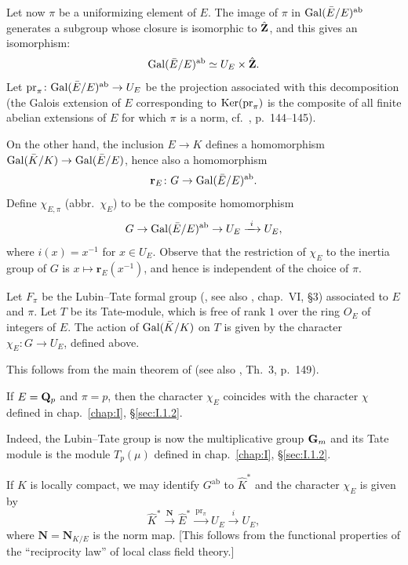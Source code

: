 Let now $\pi$ be a uniformizing element of $E$.  The image of $\pi$ in
$\mathrm{Gal}(\bar E/E)^{\mathrm{ab}}$ generates a subgroup whose closure is
isomorphic to $\hat{\mathbf{Z}}$, and this gives an isomorphism:
\[
\mathrm{Gal}(\bar E/E)^{\mathrm{ab}} \simeq U_E\times\hat{\mathbf{Z}}.
\]
Let $\mathrm{pr}_\pi\colon \mathrm{Gal}(\bar E/E)^{\mathrm{ab}}\to U_E$ be the
projection associated with this decomposition (the Galois extension of
$E$ corresponding to $\mathrm{Ker}(\mathrm{pr}_\pi)$ is the composite of all
finite abelian extensions of $E$ for which $\pi$ is a norm,
cf.~\cite{cassels-frohlich}, p.~144--145).

On the other hand, the inclusion $E\to K$ defines a homomorphism
$\mathrm{Gal}(\bar K/K)\to\mathrm{Gal}(\bar E/E)$, hence also a homomorphism
\[
\mathbf{r}_E\colon G\to\mathrm{Gal}(\bar E/E)^{\mathrm{ab}}.
\]
Define $\chi_{E,\pi}$ (abbr.\ $\chi_E$) to be the composite
homomorphism
\[
G \to \mathrm{Gal}(\bar E/E)^{\mathrm{ab}} \to U_E
\xrightarrow{\ i\ } U_E,
\]
where $i(x)=x^{-1}$ for $x\in U_E$.  Observe that the restriction of
$\chi_E$ to the inertia group of $G$ is $x\mapsto \mathbf{r}_E(x^{-1})$,
and hence is independent of the choice of $\pi$.

\begin{proposition}[4]\label{prop:III.A.4.4}
Let $F_\pi$ be the Lubin--Tate formal group (\cite{lubin-tate}, see
also \cite{cassels-frohlich}, chap.~VI, \S3) associated to $E$ and
$\pi$.  Let $T$ be its Tate-module, which is free of rank $1$ over the
ring $O_E$ of integers of $E$.  The action of $\mathrm{Gal}(\bar K/K)$ on $T$
is given by the character $\chi_E\colon G\to U_E$, defined above.
\end{proposition}

This follows from the main theorem of \cite{lubin-tate} (see also
\cite{cassels-frohlich}, Th.~3, p.~149).

\begin{corollary}
If $E=\mathbf{Q}_p$ and $\pi=p$, then the character $\chi_E$ coincides with the
character $\chi$ defined in chap.~\ref{chap:I}, \S\ref{sec:I.1.2}.
\end{corollary}

Indeed, the Lubin--Tate group is now the multiplicative group $\mathbf{G}_m$ and
its Tate module is the module $T_p(\mu)$ defined in
chap.~\ref{chap:I}, \S\ref{sec:I.1.2}.


If $K$ is locally compact, we may identify $G^{\mathrm{ab}}$ to
$\hat K^*$ and the character $\chi_E$ is given by
\[
\hat K^* \xrightarrow{\ \mathbf{N}\ } \hat E^*
\xrightarrow{\ \mathrm{pr}_\pi\ } U_E \xrightarrow{\ i\ } U_E,
\]
where $\mathbf{N}=\mathbf{N}_{K/E}$ is the norm map.  [This follows
from the functional properties of the ``reciprocity law'' of local
class field theory.]

